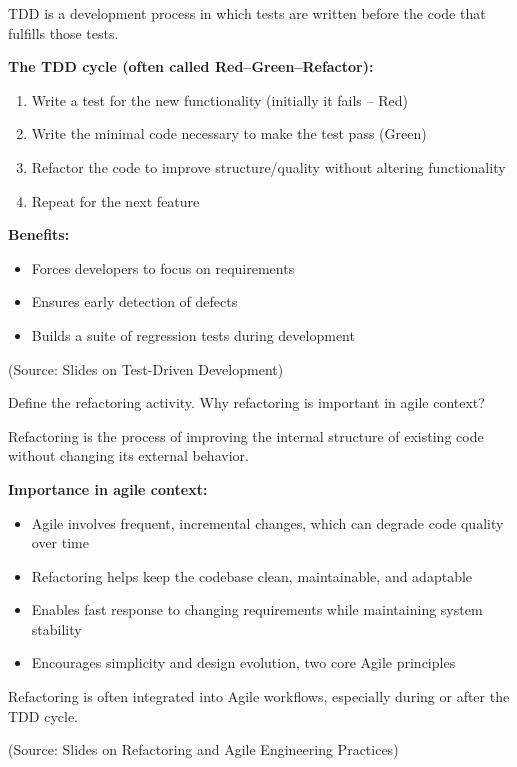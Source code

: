 \documentclass[12pt]{article}
\begin{document}
TDD is a development process in which tests are written before the code that fulfills those tests.

\textbf{The TDD cycle (often called Red–Green–Refactor):}
\begin{enumerate}
    \item Write a test for the new functionality (initially it fails – Red)
    \item Write the minimal code necessary to make the test pass (Green)
    \item Refactor the code to improve structure/quality without altering functionality
    \item Repeat for the next feature
\end{enumerate}

\textbf{Benefits:}
\begin{itemize}
    \item Forces developers to focus on requirements
    \item Ensures early detection of defects
    \item Builds a suite of regression tests during development
\end{itemize}

(Source: Slides on Test-Driven Development)

\begin{questionbox}
Define the refactoring activity. Why refactoring is important in agile context?
\end{questionbox}

Refactoring is the process of improving the internal structure of existing code without changing its external behavior.

\textbf{Importance in agile context:}
\begin{itemize}
    \item Agile involves frequent, incremental changes, which can degrade code quality over time
    \item Refactoring helps keep the codebase clean, maintainable, and adaptable
    \item Enables fast response to changing requirements while maintaining system stability
    \item Encourages simplicity and design evolution, two core Agile principles
\end{itemize}

Refactoring is often integrated into Agile workflows, especially during or after the TDD cycle.

(Source: Slides on Refactoring and Agile Engineering Practices)
\end{document}
